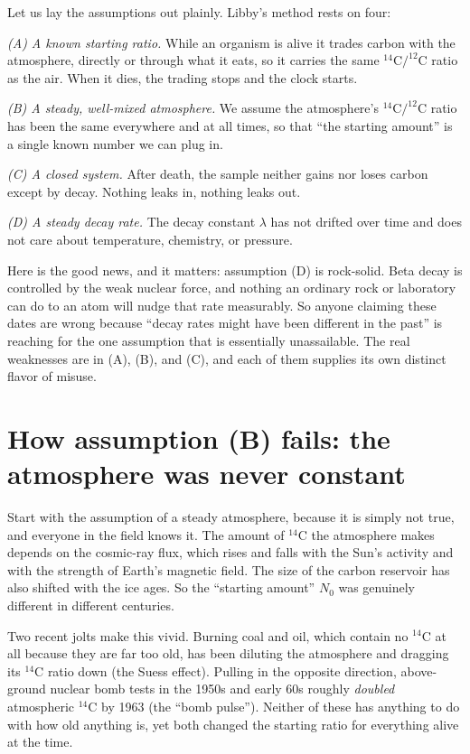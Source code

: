 \documentclass[11pt]{article}
\begin{document}
Let us lay the assumptions out plainly. Libby's method rests on four:

\emph{(A) A known starting ratio.} While an organism is alive it trades carbon with the atmosphere, directly or through what it eats, so it carries the same $^{14}\mathrm{C}/^{12}\mathrm{C}$ ratio as the air. When it dies, the trading stops and the clock starts.

\emph{(B) A steady, well-mixed atmosphere.} We assume the atmosphere's $^{14}\mathrm{C}/^{12}\mathrm{C}$ ratio has been the same everywhere and at all times, so that ``the starting amount'' is a single known number we can plug in.

\emph{(C) A closed system.} After death, the sample neither gains nor loses carbon except by decay. Nothing leaks in, nothing leaks out.

\emph{(D) A steady decay rate.} The decay constant $\lambda$ has not drifted over time and does not care about temperature, chemistry, or pressure.

Here is the good news, and it matters: assumption (D) is rock-solid. Beta decay is controlled by the weak nuclear force, and nothing an ordinary rock or laboratory can do to an atom will nudge that rate measurably. So anyone claiming these dates are wrong because ``decay rates might have been different in the past'' is reaching for the one assumption that is essentially unassailable. The real weaknesses are in (A), (B), and (C), and each of them supplies its own distinct flavor of misuse.

\section*{How assumption (B) fails: the atmosphere was never constant}

Start with the assumption of a steady atmosphere, because it is simply not true, and everyone in the field knows it. The amount of $^{14}\mathrm{C}$ the atmosphere makes depends on the cosmic-ray flux, which rises and falls with the Sun's activity and with the strength of Earth's magnetic field. The size of the carbon reservoir has also shifted with the ice ages. So the ``starting amount'' $N_0$ was genuinely different in different centuries.

Two recent jolts make this vivid. Burning coal and oil, which contain no $^{14}\mathrm{C}$ at all because they are far too old, has been diluting the atmosphere and dragging its $^{14}\mathrm{C}$ ratio down (the Suess effect). Pulling in the opposite direction, above-ground nuclear bomb tests in the 1950s and early 60s roughly \emph{doubled} atmospheric $^{14}\mathrm{C}$ by 1963 (the ``bomb pulse''). Neither of these has anything to do with how old anything is, yet both changed the starting ratio for everything alive at the time.
\end{document}

